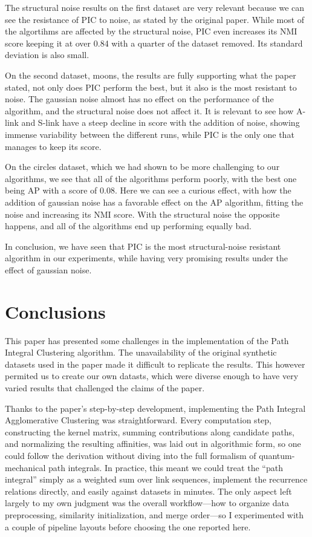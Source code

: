 \documentclass[
	10pt,
	parskip=half-,	
	paper=a4,
	english
	]{scrartcl}
\begin{document}
The structural noise results on the first dataset are very relevant because we can see the resistance of PIC to noise, as stated by the original paper. While most of the algortihms are affected by the structural noise, PIC even increases its NMI score keeping it at over 0.84 with a quarter of the dataset removed. Its standard deviation is also small.

On the second dataset, moons, the results are fully supporting what the paper stated, not only does PIC perform the best, but it also is the most resistant to noise. The gaussian noise almost has no effect on the performance of the algorithm, and the structural noise does not affect it. It is relevant to see how A-link and S-link have a steep decline in score with the addition of noise, showing immense variability between the different runs, while PIC is the only one that manages to keep its score.

On the circles dataset, which we had shown to be more challenging to our algorithms, we see that all of the algorithms perform poorly, with the best one being AP with a score of 0.08. Here we can see a curious effect, with how the addition of gaussian noise has a favorable effect on the AP algorithm, fitting the noise and increasing its NMI score. With the structural noise the opposite happens, and all of the algorithms end up performing equally bad.

In conclusion, we have seen that PIC is the most structural-noise resistant algorithm in our experiments, while having very promising results under the effect of gaussian noise.

\section{Conclusions}

This paper has presented some challenges in the implementation of the Path Integral Clustering algorithm. The unavailability of the original synthetic datasets used in the paper made it difficult to replicate the results. This however permited us to create our own datasts, which were diverse enough to have very varied results that challenged the claims of the paper.

Thanks to the paper's step-by-step development, implementing the Path Integral Agglomerative Clustering was straightforward. Every computation step, constructing the kernel matrix, summing contributions along candidate paths, and normalizing the resulting affinities, was laid out in algorithmic form, so one could follow the derivation without diving into the full formalism of quantum-mechanical path integrals. In practice, this meant we could treat the “path integral” simply as a weighted sum over link sequences, implement the recurrence relations directly, and easily against datasets in minutes. The only aspect left largely to my own judgment was the overall workflow—how to organize data preprocessing, similarity initialization, and merge order—so I experimented with a couple of pipeline layouts before choosing the one reported here.
\end{document}
